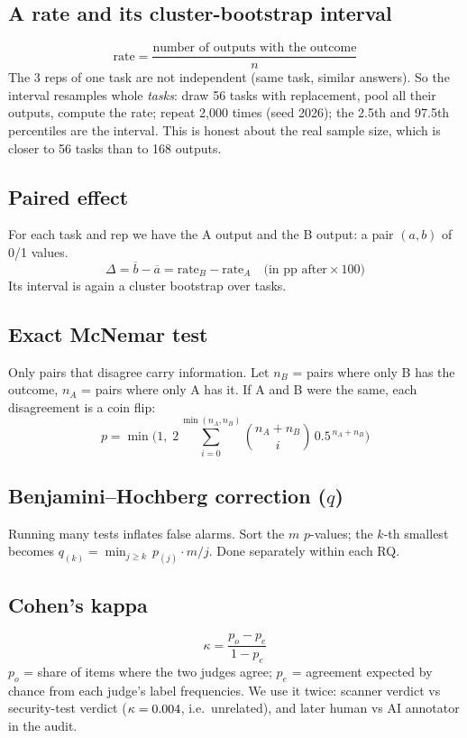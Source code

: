 \documentclass[11pt]{article}
\begin{document}
\subsection{A rate and its cluster-bootstrap interval}
\[ \text{rate} = \frac{\text{number of outputs with the outcome}}{n} \]
The 3 reps of one task are not independent (same task, similar answers). So the interval resamples whole
\emph{tasks}: draw 56 tasks with replacement, pool all their outputs, compute the rate; repeat 2{,}000 times (seed
2026); the 2.5th and 97.5th percentiles are the interval. This is honest about the real sample size, which is
closer to 56 tasks than to 168 outputs.

\subsection{Paired effect}
For each task and rep we have the A output and the B output: a pair $(a,b)$ of 0/1 values.
\[ \Delta = \overline{b} - \overline{a} = \text{rate}_B - \text{rate}_A \quad \text{(in pp after} \times 100\text{)} \]
Its interval is again a cluster bootstrap over tasks.

\subsection{Exact McNemar test}
Only pairs that disagree carry information. Let $n_{B}$ = pairs where only B has the outcome, $n_{A}$ = pairs where
only A has it. If A and B were the same, each disagreement is a coin flip:
\[ p = \min\!\Big(1,\; 2 \sum_{i=0}^{\min(n_A,n_B)} \binom{n_A+n_B}{i}\, 0.5^{\,n_A+n_B}\Big) \]

\subsection{Benjamini--Hochberg correction ($q$)}
Running many tests inflates false alarms. Sort the $m$ $p$-values; the $k$-th smallest becomes
$q_{(k)} = \min_{j\ge k}\, p_{(j)}\cdot m/j$. Done separately within each RQ.

\subsection{Cohen's kappa}
\[ \kappa = \frac{p_o - p_e}{1 - p_e} \]
$p_o$ = share of items where the two judges agree; $p_e$ = agreement expected by chance from each judge's label
frequencies. We use it twice: scanner verdict vs security-test verdict ($\kappa=0.004$, i.e.\ unrelated), and later
human vs AI annotator in the audit.
\end{document}
